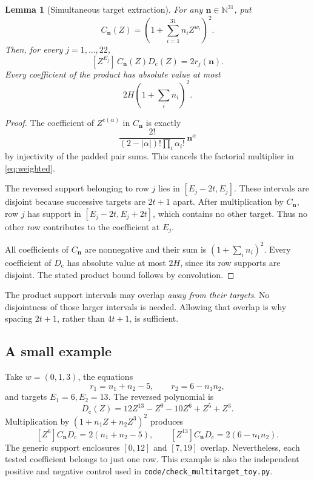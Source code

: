 \documentclass[11pt]{article}
\newcommand{\N}{\mathbb N}
\newcommand{\Dcode}{D_{\mathrm c}}
\newcommand{\file}[1]{\nolinkurl{#1}}
\newtheorem{lemma}[theorem]{Lemma}
\theoremstyle{definition}
\theoremstyle{remark}
\numberwithin{equation}{section}
\begin{document}
\begin{lemma}[Simultaneous target extraction]\label{lem:extract}
For any \(\mathbf n\in\N^{31}\), put
\[
 C_{\mathbf n}(Z)=\left(1+\sum_{i=1}^{31}n_iZ^{w_i}\right)^2.
\]
Then, for every \(j=1,\ldots,22\),
\begin{equation}\label{eq:extract}
 [Z^{E_j}]\,C_{\mathbf n}(Z)\Dcode(Z)=2r_j(\mathbf n).
\end{equation}
Every coefficient of the product has absolute value at most
\[
 2H\left(1+\sum_i n_i\right)^2.
\]
\end{lemma}

\begin{proof}
The coefficient of \(Z^{e(\alpha)}\) in \(C_{\mathbf n}\) is exactly
\[
 \frac{2!}{(2-|\alpha|)!\prod_i\alpha_i!}\,\mathbf n^\alpha
\]
by injectivity of the padded pair sums. This cancels the factorial
multiplier in \eqref{eq:weighted}.

The reversed support belonging to row \(j\) lies in
\([E_j-2t,E_j]\). These intervals are disjoint because successive targets
are \(2t+1\) apart. After multiplication by \(C_{\mathbf n}\), row \(j\)
has support in \([E_j-2t,E_j+2t]\), which contains no other target.
Thus no other row contributes to the coefficient at \(E_j\).

All coefficients of \(C_{\mathbf n}\) are nonnegative and their sum is
\((1+\sum_i n_i)^2\). Every coefficient of \(\Dcode\) has absolute value
at most \(2H\), since its row supports are disjoint. The stated product
bound follows by convolution.
\end{proof}

The product support intervals may overlap \emph{away from their targets}.
No disjointness of those larger intervals is needed. Allowing that
overlap is why spacing \(2t+1\), rather than \(4t+1\), is sufficient.

\subsection{A small example}

Take \(w=(0,1,3)\), the equations
\[
 r_1=n_1+n_2-5,\qquad r_2=6-n_1n_2,
\]
and targets \(E_1=6,E_2=13\). The reversed polynomial is
\[
 \Dcode(Z)=12Z^{13}-Z^9-10Z^6+Z^5+Z^3.
\]
Multiplication by \((1+n_1Z+n_2Z^3)^2\) produces
\[
 [Z^6]C_{\mathbf n}\Dcode=2(n_1+n_2-5),\qquad
 [Z^{13}]C_{\mathbf n}\Dcode=2(6-n_1n_2).
\]
The generic support enclosures \([0,12]\) and \([7,19]\) overlap. Nevertheless,
each tested coefficient belongs to just one row.
This example is also the independent positive and negative control used
in \file{code/check_multitarget_toy.py}.
\end{document}
